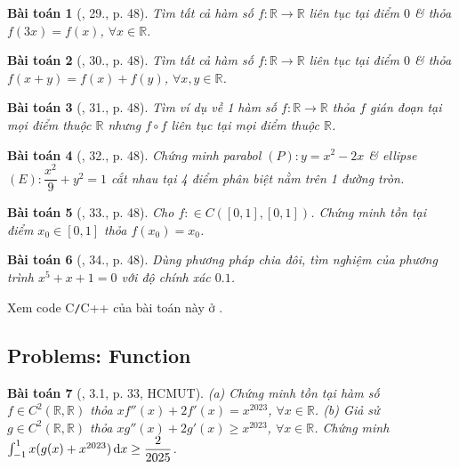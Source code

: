 \documentclass{article}
\newtheorem{baitoan}{Bài toán}
\begin{document}
\begin{baitoan}[\cite{TLCT_BT_dai_so_giai_tich_11}, 29., p. 48]
	Tìm tất cả hàm số $f:\mathbb{R}\to\mathbb{R}$ liên tục tại điểm $0$ \& thỏa $f(3x) = f(x)$, $\forall x\in\mathbb{R}$.
\end{baitoan}

\begin{baitoan}[\cite{TLCT_BT_dai_so_giai_tich_11}, 30., p. 48]
	Tìm tất cả hàm số $f:\mathbb{R}\to\mathbb{R}$ liên tục tại điểm $0$ \& thỏa $f(x + y) = f(x) + f(y) $, $\forall x,y\in\mathbb{R}$.
\end{baitoan}

\begin{baitoan}[\cite{TLCT_BT_dai_so_giai_tich_11}, 31., p. 48]
	Tìm ví dụ về 1 hàm số $f:\mathbb{R}\to\mathbb{R}$ thỏa $f$ gián đoạn tại mọi điểm thuộc $\mathbb{R}$ nhưng $f\circ f$ liên tục tại mọi điểm thuộc $\mathbb{R}$.
\end{baitoan}

\begin{baitoan}[\cite{TLCT_BT_dai_so_giai_tich_11}, 32., p. 48]
	Chứng minh parabol $(P):y = x^2 - 2x$ \& ellipse $(E):\dfrac{x^2}{9} + y^2 = 1$ cắt nhau tại 4 điểm phân biệt nằm trên 1 đường tròn.
\end{baitoan}

\begin{baitoan}[\cite{TLCT_BT_dai_so_giai_tich_11}, 33., p. 48]
	Cho $f:\in C([0,1],[0,1])$. Chứng minh tồn tại điểm $x_0\in[0,1]$ thỏa $f(x_0) = x_0$.
\end{baitoan}

\begin{baitoan}[\cite{TLCT_BT_dai_so_giai_tich_11}, 34., p. 48]
	Dùng phương pháp chia đôi, tìm nghiệm của phương trình $x^5 + x + 1 = 0$ với độ chính xác $0.1$.
\end{baitoan}
Xem code C{\tt/}C++ của bài toán này ở \cite{Thu_Phuong_Tien_Triet_NMLT}.


\subsection{Problems: Function}

\begin{baitoan}[\cite{VMS_VMC2023}, 3.1, p. 33, HCMUT]
	(a) Chứng minh tồn tại hàm số $f\in C^2(\mathbb{R},\mathbb{R})$ thỏa $xf''(x) + 2f'(x) = x^{2023}$, $\forall x\in\mathbb{R}$. (b) Giả sử $g\in C^2(\mathbb{R},\mathbb{R})$ thỏa $xg''(x) + 2g'(x)\ge x^{2023}$, $\forall x\in\mathbb{R}$. Chứng minh $\int_{-1}^1 x(g(x) + x^{2023})\,{\rm d}x\ge\dfrac{2}{2025}$.
\end{baitoan}
\end{document}
